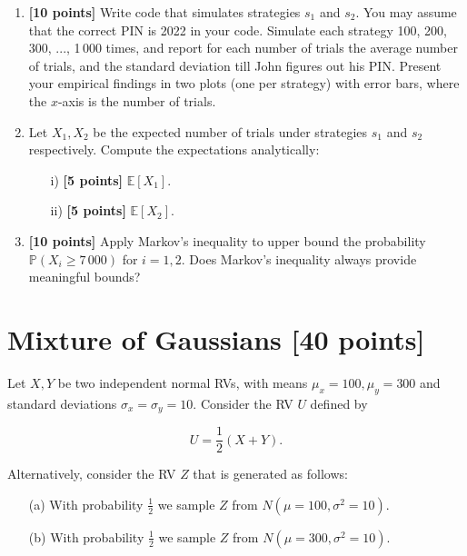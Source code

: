 \begin{tcolorbox}
\begin{enumerate}
    \item  {\bf [10 points] } Write code that simulates strategies $s_1$ and $s_2$. You may assume that the correct PIN is 2022 in your code. Simulate each strategy 100, 200, 300, ..., 1\,000 times, and report for each number of trials the average number of trials, and the standard deviation till John figures out his PIN. Present your empirical findings in two plots (one per strategy) with error bars, where the $x$-axis is the number of trials.  
    \item  Let $X_1,X_2$ be the expected number of trials under strategies $s_1$ and $s_2$ respectively. Compute the expectations analytically: 
    \begin{itemize}
        \item[i)]   {\bf [5 points] }$ \mathbb{E}[X_1]$.
        \item[ii)]  {\bf [5 points] } $ \mathbb{E}[X_2]$.
    \end{itemize} 


\item  {\bf [10 points] } Apply Markov's inequality to upper bound the probability $\mathbb{P}(X_i \geq 7\,000)$ for $i=1,2$.  Does Markov's inequality always provide meaningful bounds?
\end{enumerate}
\end{tcolorbox}

\newpage 

\section{Mixture of Gaussians [40 points]} 

Let $X,Y$ be two independent normal RVs, with means $\mu_x=100, \mu_y=300$ and standard deviations $\sigma_x=\sigma_y=10$. Consider the RV $U$ defined by 

$$ U = \frac{1}{2}(X+Y).$$


\noindent Alternatively,  consider the RV $Z$ that is generated as follows:

\begin{itemize}
	\item[(a)] With probability $\frac{1}{2}$ we sample $Z$ from $N(\mu=100, \sigma^2=10)$. 
	\item[(b)] With probability $\frac{1}{2}$ we sample $Z$ from $N(\mu=300, \sigma^2=10)$. 
\end{itemize}  



